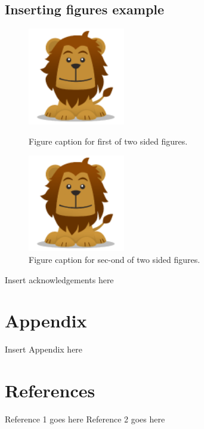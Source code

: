 \documentclass[a4paper]{jpconf} %
\begin{document}
\subsection{Inserting figures example}
\begin{figure}[h]
    \begin{minipage}{14pc}
        \includegraphics[width=10pc]{lion-128.png}
        \caption{Figure caption for first of two sided figures.}
    \end{minipage}\hspace{2pc}
    \begin{minipage}{14pc}
        \includegraphics[width=10pc]{lion-128.png}
        \caption{Figure caption for sec-ond of two sided figures.}
    \end{minipage} 
\end{figure}

\ack%
Insert acknowledgements here
 
\section*{Appendix}
Insert Appendix here

\section*{References}
\begin{thebibliography}{9}
     Reference 1 goes here
     Reference 2 goes here
\end{thebibliography}
\end{document}
